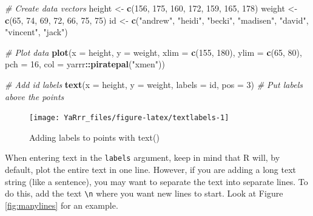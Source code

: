 \documentclass[]{book}
\newenvironment{Shaded}{\begin{snugshade}}{\end{snugshade}}
\newcommand{\KeywordTok}[1]{\textcolor[rgb]{0.13,0.29,0.53}{\textbf{#1}}}
\newcommand{\DataTypeTok}[1]{\textcolor[rgb]{0.13,0.29,0.53}{#1}}
\newcommand{\DecValTok}[1]{\textcolor[rgb]{0.00,0.00,0.81}{#1}}
\newcommand{\StringTok}[1]{\textcolor[rgb]{0.31,0.60,0.02}{#1}}
\newcommand{\CommentTok}[1]{\textcolor[rgb]{0.56,0.35,0.01}{\textit{#1}}}
\newcommand{\OperatorTok}[1]{\textcolor[rgb]{0.81,0.36,0.00}{\textbf{#1}}}
\newcommand{\NormalTok}[1]{#1}
\theoremstyle{definition}
\theoremstyle{definition}
\theoremstyle{remark}
\begin{document}
\begin{Shaded}
\begin{Highlighting}[]
\CommentTok{# Create data vectors}
\NormalTok{height <-}\StringTok{ }\KeywordTok{c}\NormalTok{(}\DecValTok{156}\NormalTok{, }\DecValTok{175}\NormalTok{, }\DecValTok{160}\NormalTok{, }\DecValTok{172}\NormalTok{, }\DecValTok{159}\NormalTok{, }\DecValTok{165}\NormalTok{, }\DecValTok{178}\NormalTok{)}
\NormalTok{weight <-}\StringTok{ }\KeywordTok{c}\NormalTok{(}\DecValTok{65}\NormalTok{, }\DecValTok{74}\NormalTok{, }\DecValTok{69}\NormalTok{, }\DecValTok{72}\NormalTok{, }\DecValTok{66}\NormalTok{, }\DecValTok{75}\NormalTok{, }\DecValTok{75}\NormalTok{)}
\NormalTok{id <-}\StringTok{ }\KeywordTok{c}\NormalTok{(}\StringTok{"andrew"}\NormalTok{, }\StringTok{"heidi"}\NormalTok{, }\StringTok{"becki"}\NormalTok{, }\StringTok{"madisen"}\NormalTok{, }\StringTok{"david"}\NormalTok{, }\StringTok{"vincent"}\NormalTok{, }\StringTok{"jack"}\NormalTok{)}

\CommentTok{# Plot data}
\KeywordTok{plot}\NormalTok{(}\DataTypeTok{x =}\NormalTok{ height, }
     \DataTypeTok{y =}\NormalTok{ weight, }
     \DataTypeTok{xlim =} \KeywordTok{c}\NormalTok{(}\DecValTok{155}\NormalTok{, }\DecValTok{180}\NormalTok{), }
     \DataTypeTok{ylim =} \KeywordTok{c}\NormalTok{(}\DecValTok{65}\NormalTok{, }\DecValTok{80}\NormalTok{), }
     \DataTypeTok{pch =} \DecValTok{16}\NormalTok{,}
     \DataTypeTok{col =}\NormalTok{ yarrr}\OperatorTok{::}\KeywordTok{piratepal}\NormalTok{(}\StringTok{"xmen"}\NormalTok{))}

\CommentTok{# Add id labels}
\KeywordTok{text}\NormalTok{(}\DataTypeTok{x =}\NormalTok{ height, }
     \DataTypeTok{y =}\NormalTok{ weight,}
     \DataTypeTok{labels =}\NormalTok{ id, }
     \DataTypeTok{pos =} \DecValTok{3}\NormalTok{)            }\CommentTok{# Put labels above the points}
\end{Highlighting}
\end{Shaded}

\begin{figure}

{\centering \texttt{[image: YaRrr\_files/figure-latex/textlabels-1]} 

}

\caption{Adding labels to points with text()}\label{fig:textlabels}
\end{figure}

When entering text in the \texttt{labels} argument, keep in mind that R
will, by default, plot the entire text in one line. However, if you are
adding a long text string (like a sentence), you may want to separate
the text into separate lines. To do this, add the text
\texttt{\textbackslash{}n} where you want new lines to start. Look at
Figure \ref{fig:manylines} for an example.
\end{document}
